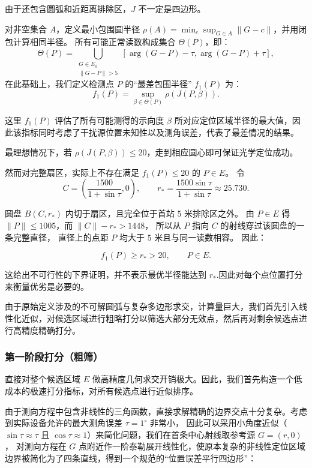 \documentclass[withoutpreface,bwprint]{cumcmthesis} %
\begin{document}
由于还包含圆弧和近距离排除区，$J$ 不一定是四边形。

对非空集合 $A$，定义最小包围圆半径
$\rho(A)=\min_c\sup_{G\in A}\|G-c\|$，并用闭包计算相同半径。
所有可能正常读数构成集合 $\Theta(P)$，即：
\begin{equation}
\Theta(P)=\bigcup_{\substack{G\in E_0\\\|G-P\|>5}}
[\arg(G-P)-\tau,\arg(G-P)+\tau],
\label{eq:q2Theta}
\end{equation}
在此基础上，我们定义检测点 $P$ 的“最差包围半径” $f_1(P)$ 为：
\begin{equation}
f_1(P)=\sup_{\beta\in\Theta(P)}\rho(J(P,\beta)).
\label{eq:q2score}
\end{equation}

这里 $f_1(P)$ 评估了所有可能测得的示向度 $\beta$ 所对应定位区域半径的最大值，因此该指标同时考虑了干扰源位置未知性以及测角误差，代表了最差情况的结果。

最理想情况下，若 $\rho(J(P,\beta))\le20$，走到相应圆心即可保证光学定位成功。

然而对完整扇区，实际上不存在满足 $f_1(P)\le20$ 的 $P\in E$。
令
\begin{equation*}
C=\left(\frac{1500}{1+\sin\tau},0\right),\qquad
r_*=\frac{1500\sin\tau}{1+\sin\tau}\approx25.730.
\end{equation*}

圆盘 $B(C,r_*)$ 内切于扇区，且完全位于首站 $5$ 米排除区之外。
由 $P\in E$ 得 $\|P\|\le1005$，而 $\|C\|-r_*>1448$，
所以从 $P$ 指向 $C$ 的射线穿过该圆盘的一条完整直径，
直径上的点距 $P$ 均大于 $5$ 米且与同一读数相容。
因此：

\begin{equation*}
f_1(P)\ge r_*>20,\qquad P\in E.
\end{equation*}

这给出不可行性的下界证明，并不表示最优半径能达到 $r_*$.因此对每个点位置打分来衡量优劣是必要的。

由于原始定义涉及的不可解圆弧与复杂多边形求交，计算量巨大，我们首先引入线性化近似，对候选区域进行粗略打分以筛选大部分无效点，然后再对剩余候选点进行高精度精确打分。

\subsubsection{第一阶段打分（粗筛）}

直接对整个候选区域 $E$ 做高精度几何求交开销极大。因此，我们首先构造一个低成本的极速打分指标，对所有候选点进行近似排序。

由于测向方程中包含非线性的三角函数，直接求解精确的边界交点十分复杂。考虑到实际设备允许的最大测角误差 $\tau = 1^\circ$ 非常小，
因此可以采用小角度近似（$\sin\tau \approx \tau$ 且 $\cos\tau \approx 1$）来简化问题，我们在首条中心射线取参考源 $G=(r,0)$，
对测向方程在 $G$ 点附近作一阶泰勒展开线性化，使原本复杂的非线性定位区域边界被简化为了四条直线，得到一个规范的“位置误差平行四边形”：
\end{document}
